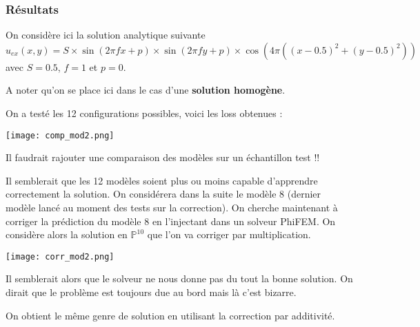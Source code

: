 \subsubsection{Résultats}

On considère ici la solution analytique suivante
$$u_{ex}(x,y)=S\times\sin(2\pi fx+p)\times\sin(2\pi fy+p)\times\cos(4\pi((x-0.5)^2+(y-0.5)^2))$$
avec $S=0.5$, $f=1$ et $p=0$.

\begin{Rem}
	A noter qu'on se place ici dans le cas d'une \textbf{solution homogène}.
\end{Rem}

On a testé les 12 configurations possibles, voici les loss obtenues :

\begin{minipage}{\linewidth}
	\centering
	\texttt{[image: comp\_mod2.png]}
\end{minipage}

\begin{Rem}
	Il faudrait rajouter une comparaison des modèles sur un échantillon test !!
\end{Rem}

\newpage


Il semblerait que les 12 modèles soient plus ou moins capable d'apprendre correctement la solution. On considérera dans la suite le modèle 8 (dernier modèle lancé au moment des tests sur la correction). On cherche maintenant à corriger la prédiction du modèle 8 en l'injectant dans un solveur PhiFEM. On considère alors la solution en $\mathbb{P}^{10}$ que l'on va corriger par multiplication.

\begin{minipage}{\linewidth}
	\centering
	\texttt{[image: corr\_mod2.png]}
\end{minipage}

Il semblerait alors que le solveur ne nous donne pas du tout la bonne solution. On dirait que le problème est toujours due au bord mais là c'est bizarre.

\begin{Rem}
	On obtient le même genre de solution en utilisant la correction par additivité.
\end{Rem}

